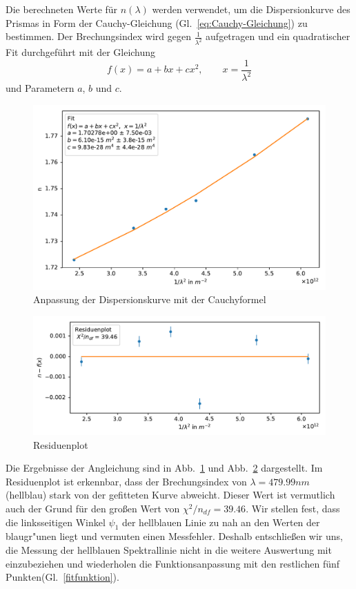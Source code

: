 \documentclass[12pt,a4paper]{article}
\begin{document}
Die berechneten Werte für $n(\lambda)$ werden verwendet, um die Dispersionkurve des Prismas in Form der Cauchy-Gleichung (Gl.~\eqref{eq:Cauchy-Gleichung}) zu bestimmen. Der Brechungsindex wird gegen $\frac{1}{\lambda^2}$ aufgetragen und ein quadratischer Fit durchgeführt mit der Gleichung
\begin{equation}\label{fitfunktion}
f(x)=a+bx+cx^2,\qquad x=\frac{1}{\lambda^2}
\end{equation}
und Parametern $a$, $b$ und $c$.\\
\begin{figure}[H]
	\centering
	\includegraphics[width=0.7\linewidth]{Python/CdHg_Fit_Messfehler.pdf}
	\caption{Anpassung der Dispersionskurve mit der Cauchyformel}
	\label{CdHg_Fit_Messfehler}
\end{figure}
\begin{figure}[H]
	\centering
	\includegraphics[width=0.7\linewidth]{Python/CdHg_Residuen_Messfehler.pdf}
	\caption{Residuenplot}
	\label{CdHg_Residuenplot_Messfehler}
\end{figure}
Die Ergebnisse der Angleichung sind in Abb.~\ref{CdHg_Fit_Messfehler} und Abb.~\ref{CdHg_Residuenplot_Messfehler} dargestellt. Im Residuenplot ist erkennbar, dass der Brechungsindex von $\lambda=479.99nm$ (hellblau) stark von der gefitteten Kurve abweicht. Dieser Wert ist vermutlich auch der Grund für den großen Wert von $\chi^2/n_{df}=39.46$. Wir stellen fest, dass die linksseitigen Winkel $\psi_1$ der hellblauen Linie zu nah an den Werten der blaugr"unen liegt und vermuten einen Messfehler. Deshalb entschließen wir uns, die Messung der hellblauen Spektrallinie nicht in die weitere Auswertung mit einzubeziehen und wiederholen die Funktionsanpassung mit den restlichen fünf Punkten(Gl.~\eqref{fitfunktion}).
\end{document}

